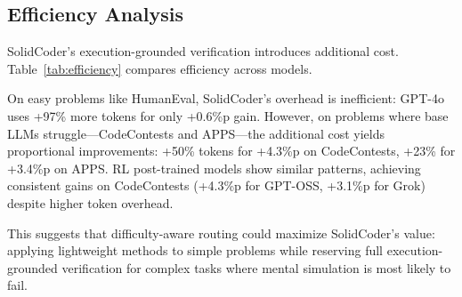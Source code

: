 \documentclass[11pt]{article}
\begin{document}
\subsection{Efficiency Analysis}


SolidCoder's execution-grounded verification introduces additional cost. Table~\ref{tab:efficiency} compares efficiency across models.

On easy problems like HumanEval, SolidCoder's overhead is inefficient: GPT-4o uses +97\% more tokens for only +0.6\%p gain. However, on problems where base LLMs struggle---CodeContests and APPS---the additional cost yields proportional improvements: +50\% tokens for +4.3\%p on CodeContests, +23\% for +3.4\%p on APPS. RL post-trained models show similar patterns, achieving consistent gains on CodeContests (+4.3\%p for GPT-OSS, +3.1\%p for Grok) despite higher token overhead.

This suggests that difficulty-aware routing could maximize SolidCoder's value: applying lightweight methods to simple problems while reserving full execution-grounded verification for complex tasks where mental simulation is most likely to fail.
\end{document}
